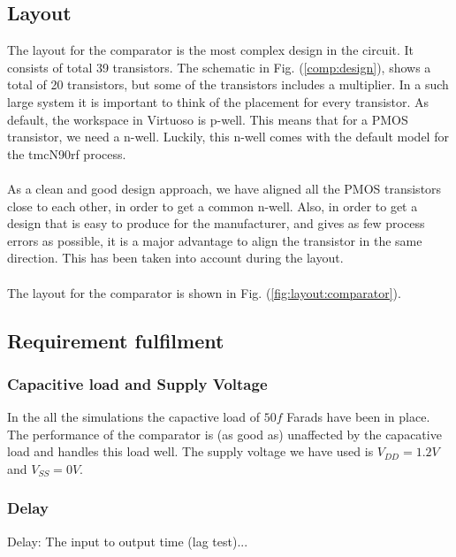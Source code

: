 \documentclass[english, 12pt, a4paper]{ifimaster}
\begin{document}
\subsection{Layout}
The layout for the comparator is the most complex design in the circuit. It consists 
of total 39 transistors. The schematic in Fig. (\ref{comp:design}), shows a total of 20 transistors, but some of the
transistors includes a multiplier. In a such large system it is important to think 
of the placement for every transistor. As default, the workspace in Virtuoso is p-well. 
This means that for a PMOS transistor, we need a n-well. Luckily, this n-well comes 
with the default model for the tmcN90rf process. \\
\\
As a clean and good design approach, we have aligned all the PMOS transistors close 
to each other, in order to get a common n-well. Also, in order to get a design that 
is easy to produce for the manufacturer, and gives as few process errors as 
possible, it is a major advantage to align the transistor in the same direction. 
This has been taken into account during the layout.\\
\\
The layout for the comparator is shown in Fig. (\ref{fig:layout:comparator}). 



\subsection{Requirement fulfilment}
\subsubsection{Capacitive load and Supply Voltage}
In the all the simulations the capactive load of \(50 f\) Farads have been in place. The performance of the comparator is (as good as) unaffected by the capacative load and handles this load well.
The supply voltage we have used is \(V_{DD} = 1.2V\) and \(V_{SS} = 0V\).

\subsubsection{Delay}
Delay: The input to output time (lag test)...
\end{document}
